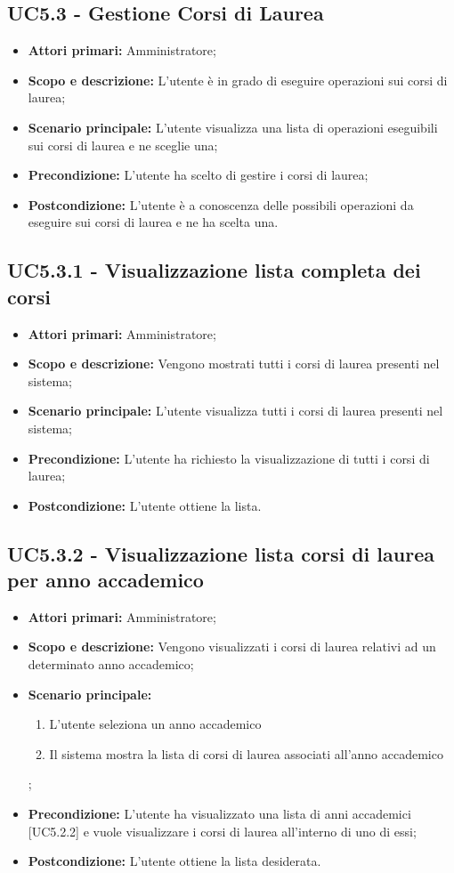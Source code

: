 \documentclass[AnalisiDeiRequisiti.tex]{subfiles}
\begin{document}
\subsection{UC5.3 - Gestione Corsi di Laurea}
\begin{itemize}
	\item \textbf{Attori primari:} Amministratore;
	\item \textbf{Scopo e descrizione:} L'utente è in grado di eseguire operazioni sui corsi di laurea;
	\item \textbf{Scenario principale:} L'utente visualizza una lista di operazioni eseguibili sui corsi di laurea e ne sceglie una;
	\item \textbf{Precondizione:} L'utente ha scelto di gestire i corsi di laurea; 
	\item \textbf{Postcondizione:} L'utente è a conoscenza delle possibili operazioni da eseguire sui corsi di laurea e ne ha scelta una.
\end{itemize}
\subsection{UC5.3.1 - Visualizzazione lista completa dei corsi}
\begin{itemize}
	\item \textbf{Attori primari:} Amministratore;
	\item \textbf{Scopo e descrizione:} Vengono mostrati tutti i corsi di laurea presenti nel sistema;
	\item \textbf{Scenario principale:} L'utente visualizza tutti i corsi di laurea presenti nel sistema;
	\item \textbf{Precondizione:} L'utente ha richiesto la visualizzazione di tutti i corsi di laurea; 
	\item \textbf{Postcondizione:} L'utente ottiene la lista.
\end{itemize}
\subsection{UC5.3.2 - Visualizzazione lista corsi di laurea per anno accademico}
\begin{itemize}
	\item \textbf{Attori primari:} Amministratore;
	\item \textbf{Scopo e descrizione:} Vengono visualizzati i corsi di laurea relativi ad un determinato anno accademico;
	\item \textbf{Scenario principale:}
	\begin{enumerate}
		\item L'utente seleziona un anno accademico
		\item Il sistema mostra la lista di corsi di laurea associati all'anno accademico
	\end{enumerate};
	\item \textbf{Precondizione:} L'utente ha visualizzato una lista di anni accademici [UC5.2.2] e vuole visualizzare i corsi di laurea all'interno di uno di essi; 
	\item \textbf{Postcondizione:} L'utente ottiene la lista desiderata.
\end{itemize}
\end{document}

